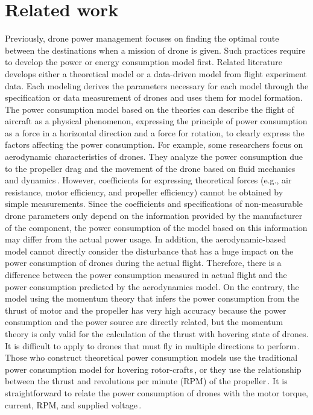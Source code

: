\documentclass[journal]{./template/IEEEtran}
\begin{document}
\section{Related work}

Previously, drone power management focuses on finding the optimal route between the destinations when a mission of drone is given.
Such practices require to develop the power or energy consumption model first. 
Related literature develops either a theoretical model or a data-driven model from flight experiment data. 
Each modeling derives the parameters necessary for each model through the specification or data measurement of drones and uses them for model formation.
The power consumption model based on the theories can describe the flight of aircraft as a physical phenomenon, expressing the principle of power consumption as a force in a horizontal direction and a force for rotation, to clearly express the factors affecting the power consumption.
For example, some researchers focus on aerodynamic characteristics of drones.
They analyze the power consumption due to the propeller drag and the movement of the drone based on fluid mechanics and dynamics\,\cite{ref_3}.
However, coefficients for expressing theoretical forces (e.g., air resistance, motor efficiency, and propeller efficiency) cannot be obtained by simple measurements. 
Since the coefficients and specifications of non-measurable drone parameters only depend on the information provided by the manufacturer of the component, the power consumption of the model based on this information may differ from the actual power usage.
In addition, the aerodynamic-based model cannot directly consider the disturbance that has a huge impact on the power consumption of drones during the actual flight.
Therefore, there is a difference between the power consumption measured in actual flight and the power consumption predicted by the aerodynamics model.
On the contrary, the model using the momentum theory that infers the power consumption from the thrust of motor and the propeller has very high accuracy because the power consumption and the power source are directly related, but the momentum theory is only valid for the calculation of the thrust with hovering state of drones. 
It is difficult to apply to drones that must fly in multiple directions to perform\,\cite{ref_4}.
Those who construct theoretical power consumption models use the traditional power consumption model for hovering rotor-crafts\,\cite{ref_4}, or they use the relationship between the thrust and revolutions per minute (RPM) of the propeller\,\cite{ref_5}. 
It is straightforward to relate the power consumption of drones with the motor torque, current, RPM, and supplied voltage\,\cite{ref_6,ref_7}.
\end{document}

